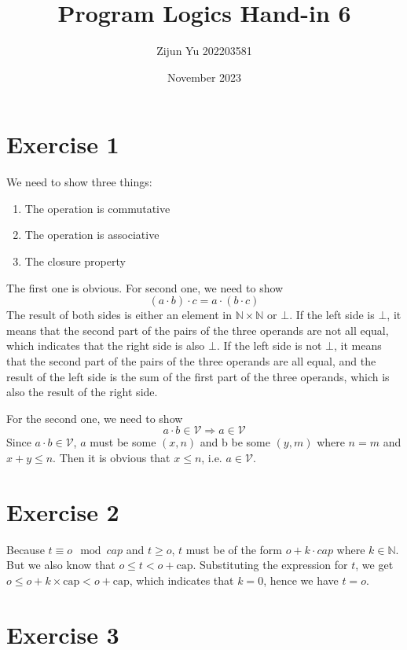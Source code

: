 \documentclass{article}
\title{Program Logics Hand-in 6}
\author{Zijun Yu 202203581}
\date{November 2023}
\begin{document}


\maketitle

\section*{Exercise 1}

We need to show three things:
\begin{enumerate}
    \item The operation is commutative
    \item The operation is associative
    \item The closure property
\end{enumerate}

The first one is obvious. For second one, we need to show
$$(a \cdot b) \cdot c = a \cdot (b \cdot c)$$
The result of both sides is either an element in $\mathbb{N} \times \mathbb{N}$ or $\bot$.
If the left side is $\bot$, it means that the second part of the pairs of the three operands are not all equal,
which indicates that the right side is also $\bot$. If the left side is not $\bot$,
it means that the second part of the pairs of the three operands are all equal,
and the result of the left side is the sum of the first part of the three operands, which is also the result of the right side.

For the second one, we need to show
$$a \cdot b \in \mathcal{V} \Rightarrow a \in \mathcal{V}$$
Since $a \cdot b \in \mathcal{V}$, $a$ must be some $(x, n)$ and b be some $(y, m)$ where
$n=m$ and $x+y\leq n$. Then it is obvious that $x\leq n$, i.e. $a \in \mathcal{V}$.

\section*{Exercise 2}

Because $t \equiv o \mod cap$ and $t \geq o$, $t$ must be of the form $o + k \cdot cap$ where $k \in \mathbb{N}$.
But we also know that $o \leq t < o + \text{cap}$. Substituting the expression for $t$,
we get $o \leq o + k \times \text{cap} < o + \text{cap}$, which indicates that $k = 0$,
hence we have $t = o$.

\section*{Exercise 3}
\end{document}
